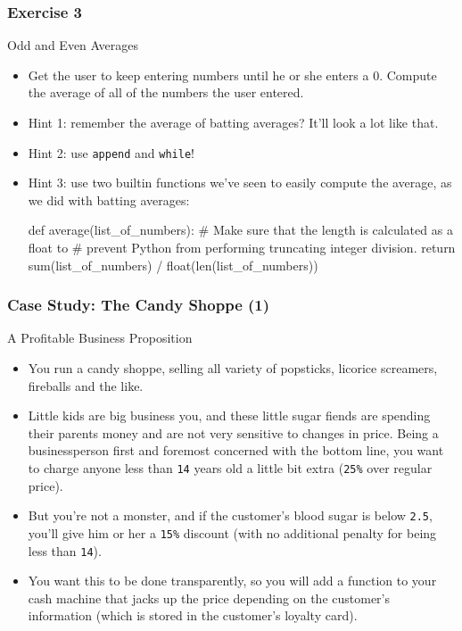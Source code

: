 \documentclass[10pt]{beamer}
\begin{document}
\begin{frame}[fragile]
  \frametitle{Exercise 3}
  \begin{block}{Odd and Even Averages}
    \begin{itemize}
      \item Get the user to keep entering numbers until he or she enters a 0.
        Compute the average of all of the numbers the user entered.
      \item Hint 1: remember the average of batting averages?
        It'll look a lot like that.
      \item Hint 2: use \texttt{append} and \texttt{while}!
      \item Hint 3: use two builtin functions we've seen to easily compute the average, as we did with batting averages:
        \footnotesize
        \begin{pythoncode}
  def average(list_of_numbers):
    # Make sure that the length is calculated as a float to
    # prevent Python from performing truncating integer division.
    return sum(list_of_numbers) / float(len(list_of_numbers))
        \end{pythoncode}
    \end{itemize} 
  \end{block}
\end{frame}
    
\begin{frame}
  \frametitle{Case Study: The Candy Shoppe (1)}
  \begin{block}{A Profitable Business Proposition}
    \begin{itemize}
      \item You run a candy shoppe, selling all variety of popsticks, licorice screamers, fireballs and the like.
      \item Little kids are big business you, and these little sugar fiends are spending their parents money and are not very sensitive to changes in price.
        Being a businessperson first and foremost concerned with the bottom line, you want to charge anyone less than \texttt{14} years old a little bit extra (\texttt{25\%} over regular price).
      \item But you're not a monster, and if the customer's blood sugar is below \texttt{2.5}, you'll give him or her a \texttt{15\%} discount (with no additional penalty for being less than \texttt{14}).
      \item You want this to be done transparently, so you will add a function to your cash machine that jacks up the price depending on the customer's information (which is stored in the customer's loyalty card).
    \end{itemize}
  \end{block}
\end{frame}
\end{document}
